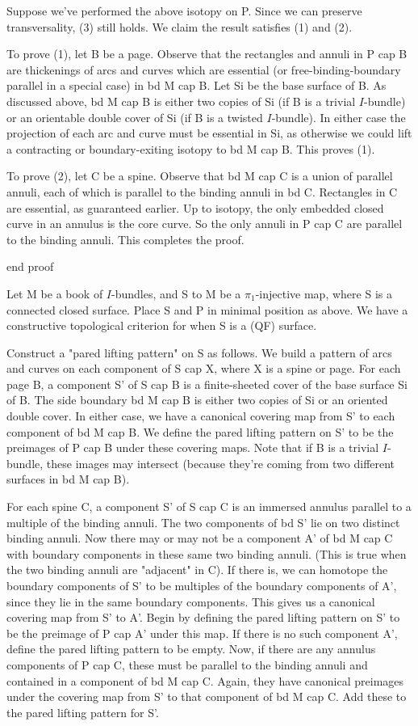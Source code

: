 Suppose we've performed the above isotopy on P. Since we can preserve
transversality, (3) still holds. We claim the result satisfies (1) and (2).

To prove (1), let B be a page. Observe that the rectangles and annuli in P cap
B are thickenings of arcs and curves which are essential (or
free-binding-boundary parallel in a special case) in bd M cap B. Let Si be the
base surface of B. As discussed above, bd M cap B is either two copies of Si
(if B is a trivial $I$-bundle) or an orientable double cover of Si (if B is
a twisted $I$-bundle). In either case the projection of each arc and curve must
be essential in Si, as otherwise we could lift a contracting or
boundary-exiting isotopy to bd M cap B. This proves (1).

To prove (2), let C be a spine. Observe that bd M cap C is a union of parallel
annuli, each of which is parallel to the binding annuli in bd C. Rectangles in
C are essential, as guaranteed earlier. Up to isotopy, the only embedded closed
curve in an annulus is the core curve. So the only annuli in P cap C are
parallel to the binding annuli. This completes the proof.

end proof

Let M be a book of $I$-bundles, and S to M be a $\pi_1$-injective map, where S is
a connected closed surface.  Place S and P in minimal position as above. We
have a constructive topological criterion for when S is a (QF) surface.

Construct a "pared lifting pattern" on S as follows. We build a pattern of arcs
and curves on each component of S cap X, where X is a spine or page. For each
page B, a component S' of S cap B is a finite-sheeted cover of the base surface
Si of B. The side boundary bd M cap B is either two copies of Si or an oriented
double cover. In either case, we have a canonical covering map from S' to each
component of bd M cap B. We define the pared lifting pattern on S' to be the
preimages of P cap B under these covering maps. Note that if B is a trivial
$I$-bundle, these images may intersect (because they're coming from two different
surfaces in bd M cap B).

For each spine C, a component S' of S cap C is an immersed annulus parallel to
a multiple of the binding annuli.  The two components of bd S' lie on two
distinct binding annuli. Now there may or may not be a component A' of bd M cap
C with boundary components in these same two binding annuli. (This is true when
the two binding annuli are "adjacent" in C). If there is, we can homotope the
boundary components of S' to be multiples of the boundary components of A',
since they lie in the same boundary components. This gives us a canonical
covering map from S' to A'. Begin by defining the pared lifting pattern on S' to
be the preimage of P cap A' under this map. If there is no such component A',
define the pared lifting pattern to be empty. Now, if there are any annulus
components of P cap C, these must be parallel to the binding annuli and
contained in a component of bd M cap C.  Again, they have canonical preimages
under the covering map from S' to that component of bd M cap C. Add these to
the pared lifting pattern for S'.

